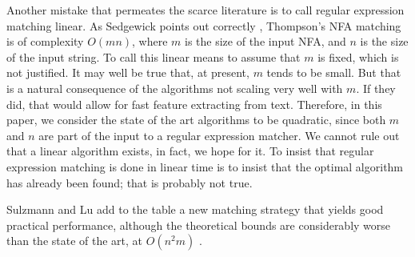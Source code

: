 \documentclass[english]{sigplanconf}
\theoremstyle{definition}
\begin{document}
Another mistake that permeates the scarce literature is to call regular
expression matching linear. As Sedgewick points out correctly \cite{Sedg90a},
Thompson's NFA matching is of complexity $O(mn)$, where $m$ is the
size of the input NFA, and $n$ is the size of the input string. To
call this linear means to assume that $m$ is fixed, which is not justified. It may well be true that, at present,
$m$ tends to be small. But that is a natural consequence of the algorithms
not scaling very well with $m$. If they did, that would allow for
fast feature extracting from text. Therefore, in this paper, we consider
the state of the art algorithms to be quadratic, since both $m$ and
$n$ are part of the input to a regular expression matcher. We cannot
rule out that a linear algorithm exists, in fact, we hope for it.
To insist that regular expression matching is done in linear time
is to insist that the optimal algorithm has already been found; that
is probably not true.

Sulzmann and Lu add to the table a new matching strategy that yields
good practical performance, although the theoretical bounds are considerably
worse than the state of the art, at $O(n^{2}m)$ \cite{Sulz12a}.



\end{document}
